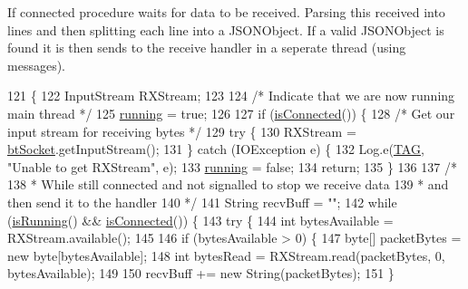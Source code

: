 If connected procedure waits for data to be received. Parsing this received into lines and then splitting each line into a J\+S\+O\+N\+Object. If a valid J\+S\+O\+N\+Object is found it is then sends to the receive handler in a seperate thread (using messages). 
\begin{DoxyCode}
121                       \{
122         InputStream RXStream;
123 
124         \textcolor{comment}{/* Indicate that we are now running main thread */}
125         \hyperlink{class_android_app_1_1_b_t_connection_ace01a7a97f5d1abccb61a5d6c6ad9295}{running} = \textcolor{keyword}{true};
126 
127         \textcolor{keywordflow}{if} (\hyperlink{class_android_app_1_1_b_t_connection_a1c91fcddfe9f3b69cd0141742103191a}{isConnected}()) \{
128             \textcolor{comment}{/* Get our input stream for receiving bytes */}
129             \textcolor{keywordflow}{try} \{
130                 RXStream = \hyperlink{class_android_app_1_1_b_t_connection_af3cdc6c880b28361d87d0118ace0e49c}{btSocket}.getInputStream();
131             \} \textcolor{keywordflow}{catch} (IOException e) \{
132                 Log.e(\hyperlink{class_android_app_1_1_b_t_connection_ad838024d59c68be866b5db329d6f6230}{TAG}, \textcolor{stringliteral}{"Unable to get RXStream"}, e);
133                 \hyperlink{class_android_app_1_1_b_t_connection_ace01a7a97f5d1abccb61a5d6c6ad9295}{running} = \textcolor{keyword}{false};
134                 \textcolor{keywordflow}{return};
135             \}
136 
137             \textcolor{comment}{/*}
138 \textcolor{comment}{             * While still connected and not signalled to stop we receive data}
139 \textcolor{comment}{             * and then send it to the handler}
140 \textcolor{comment}{             */}
141             String recvBuff = \textcolor{stringliteral}{""};
142             \textcolor{keywordflow}{while} (\hyperlink{class_android_app_1_1_b_t_connection_a88abb39350aef278f15e54be4d0d1df3}{isRunning}() && \hyperlink{class_android_app_1_1_b_t_connection_a1c91fcddfe9f3b69cd0141742103191a}{isConnected}()) \{
143                 \textcolor{keywordflow}{try} \{
144                     \textcolor{keywordtype}{int} bytesAvailable = RXStream.available();
145 
146                     \textcolor{keywordflow}{if} (bytesAvailable > 0) \{
147                         byte[] packetBytes = \textcolor{keyword}{new} byte[bytesAvailable];
148                         \textcolor{keywordtype}{int} bytesRead = RXStream.read(packetBytes, 0, bytesAvailable);
149 
150                         recvBuff += \textcolor{keyword}{new} String(packetBytes);
151                     \}

\end{DoxyCode}
